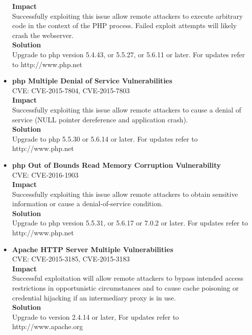 \begin{itemize}
\textbf{Impact} \\
Successfully exploiting this issue allow remote attackers to execute arbitrary code in the context of the PHP process. Failed exploit attempts will likely crash the webserver.\\

\textbf{Solution}\\
Upgrade to php version 5.4.43, or 5.5.27, or 5.6.11 or later. For updates refer to http://www.php.net\\

\item \textbf{php Multiple Denial of Service Vulnerabilities} \\
CVE: CVE-2015-7804, CVE-2015-7803\\

\textbf{Impact} \\
Successfully exploiting this issue allow remote attackers to cause a denial of service (NULL pointer dereference and application crash).\\

\textbf{Solution}\\
Upgrade to php 5.5.30 or 5.6.14 or later. For updates refer to http://www.php.net\\

\item \textbf{php Out of Bounds Read Memory Corruption Vulnerability} \\
CVE: CVE-2016-1903\\

\textbf{Impact} \\
Successfully exploiting this issue allow remote attackers to obtain sensitive information or cause a denial-of-service condition.\\

\textbf{Solution}\\
Upgrade to php version 5.5.31, or 5.6.17 or 7.0.2 or later. For updates refer to http://www.php.net\\


\item \textbf{Apache HTTP Server Multiple Vulnerabilities} \\
CVE: CVE-2015-3185, CVE-2015-3183\\

\textbf{Impact} \\
Successful exploitation will allow remote attackers to bypass intended access restrictions in opportunistic circumstances and to cause cache poisoning or credential hijacking if an intermediary proxy is in use.\\

\textbf{Solution}\\
Upgrade to version 2.4.14 or later, For updates refer to http://www.apache.org\\
\end{itemize}